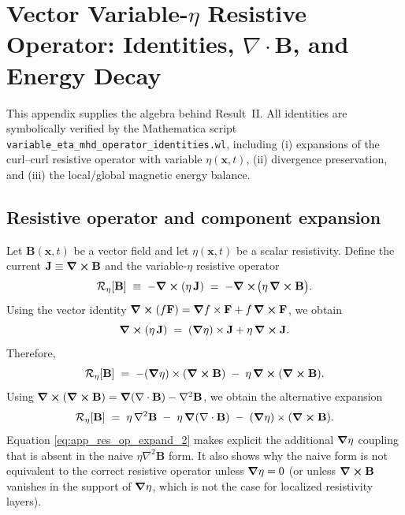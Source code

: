 \documentclass[11pt]{article}
\theoremstyle{plain}
\theoremstyle{definition}
\theoremstyle{remark}
\newcommand{\diver}{\nabla\cdot}
\newcommand{\B}{\mathbf{B}}
\newcommand{\J}{\mathbf{J}}
\begin{document}
\section{Vector Variable-$\eta$ Resistive Operator: Identities, $\diver\B$, and Energy Decay}\label{sec:app_vector_eta}

This appendix supplies the algebra behind Result~II. All identities are symbolically verified by the
Mathematica script \texttt{variable\_eta\_mhd\_operator\_identities.wl}, including (i) expansions of the
curl--curl resistive operator with variable $\eta(\mathbf{x},t)$, (ii) divergence preservation, and
(iii) the local/global magnetic energy balance.

\subsection{Resistive operator and component expansion}
Let $\B(\mathbf{x},t)$ be a vector field and let $\eta(\mathbf{x},t)$ be a scalar resistivity.
Define the current $\J\equiv\curl\B$ and the variable-$\eta$ resistive operator
\begin{equation}\label{eq:app_res_op_def}
  \mathcal{R}_{\eta}[\B] \;\equiv\; -\curl(\eta\,\J) \;=\; -\curl\!\big(\eta\,\curl\B\big).
\end{equation}
Using the vector identity $\curl(f\mathbf{F})=\grad f\times\mathbf{F}+f\,\curl\mathbf{F}$, we obtain
\begin{equation}\label{eq:app_curl_product}
  \curl(\eta\,\J) \;=\; (\grad\eta)\times\J + \eta\,\curl\J.
\end{equation}
Therefore,
\begin{equation}\label{eq:app_res_op_expand_1}
  \mathcal{R}_{\eta}[\B]
  \;=\;
  -(\grad\eta)\times(\curl\B) \;-\; \eta\,\curl(\curl\B).
\end{equation}
Using $\curl(\curl\B)=\grad(\diver\B)-\nabla^2\B$, we obtain the alternative expansion
\begin{equation}\label{eq:app_res_op_expand_2}
  \mathcal{R}_{\eta}[\B]
  \;=\;
  \eta\,\nabla^2\B \;-\; \eta\,\grad(\diver\B) \;-\; (\grad\eta)\times(\curl\B).
\end{equation}
Equation \eqref{eq:app_res_op_expand_2} makes explicit the additional $\grad\eta$ coupling that is
absent in the naive $\eta\nabla^2\B$ form. It also shows why the naive form is not equivalent to the
correct resistive operator unless $\grad\eta=0$ (or unless $\curl\B$ vanishes in the support of
$\grad\eta$, which is not the case for localized resistivity layers).
\end{document}
